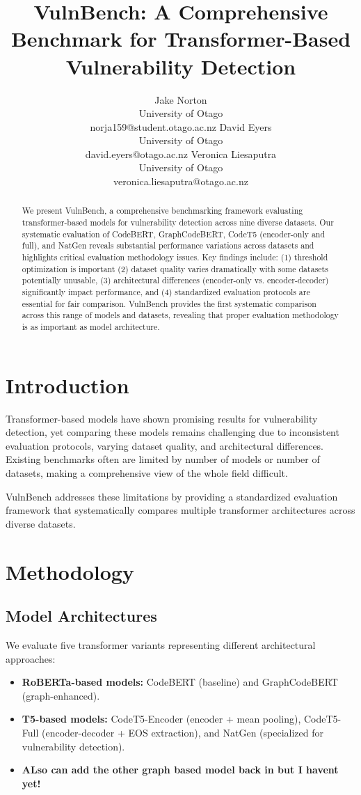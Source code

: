 \documentclass[letterpaper]{article}
\title{VulnBench: A Comprehensive Benchmark for Transformer-Based Vulnerability Detection}
\author{
Jake Norton\\
University of Otago\\
norja159@student.otago.ac.nz
\And
David Eyers\\
University of Otago\\
david.eyers@otago.ac.nz
\And
Veronica Liesaputra\\
University of Otago\\
veronica.liesaputra@otago.ac.nz
}
\begin{document}
\maketitle

\begin{abstract}
	We present VulnBench, a comprehensive benchmarking framework evaluating transformer-based models for vulnerability detection across nine diverse datasets. Our systematic evaluation of CodeBERT, GraphCodeBERT, CodeT5 (encoder-only and full), and NatGen reveals substantial performance variations across datasets and highlights critical evaluation methodology issues. Key findings include: (1) threshold optimization is important (2) dataset quality varies dramatically with some datasets potentially unusable, (3) architectural differences (encoder-only vs. encoder-decoder) significantly impact performance, and (4) standardized evaluation protocols are essential for fair comparison. VulnBench provides the first systematic comparison across this range of models and datasets, revealing that proper evaluation methodology is as important as model architecture.
\end{abstract}

\section{Introduction}

Transformer-based models have shown promising results for vulnerability detection, yet comparing these models remains challenging due to inconsistent evaluation protocols, varying dataset quality, and architectural differences. Existing benchmarks often are limited by number of models or number of datasets, making a comprehensive view of the whole field difficult.

VulnBench addresses these limitations by providing a standardized evaluation framework that systematically compares multiple transformer architectures across diverse datasets.

\section{Methodology}

\subsection{Model Architectures}
We evaluate five transformer variants representing different architectural approaches:
\begin{itemize}
	\item \textbf{RoBERTa-based models:} CodeBERT (baseline) and GraphCodeBERT (graph-enhanced).
	\item \textbf{T5-based models:} CodeT5-Encoder (encoder + mean pooling), CodeT5-Full (encoder-decoder + EOS extraction), and NatGen (specialized for vulnerability detection).
	\item \textbf{ALso can add the other graph based model back in but I havent yet!}
\end{itemize}
\end{document}
